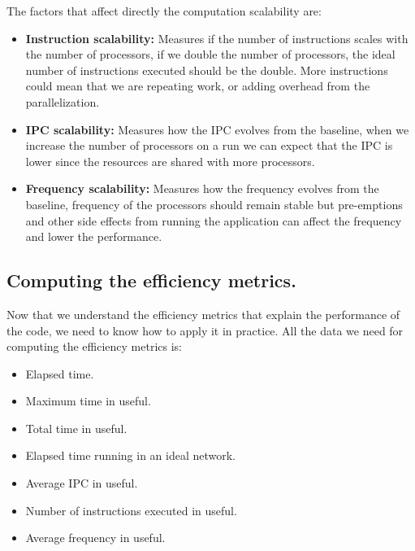 The factors that affect directly the computation scalability are:
\begin{itemize}
  \item \textbf{Instruction scalability:} Measures if the number of instructions scales with the number of processors, if we double the number of processors, the ideal number of instructions executed should be the double. More instructions could mean that we are repeating work, or adding overhead from the parallelization.

  \item \textbf{IPC scalability:} Measures how the IPC evolves from the baseline, when we increase the number of processors on a run we can expect that the IPC is lower since the resources are shared with more processors. 

  \item \textbf{Frequency scalability:} Measures how the frequency evolves from the baseline, frequency of the processors should remain stable but pre-emptions and other side effects from running the application can affect the frequency and lower the performance.
\end{itemize}

\subsection{Computing the efficiency metrics.}

Now that we understand the efficiency metrics that explain the performance of the code, we need to know how to apply it in practice. All the data we need for computing the efficiency metrics is:
\begin{itemize}
  \item Elapsed time.
  \item Maximum time in useful.
  \item Total time in useful.
  \item Elapsed time running in an ideal network.
  \item Average IPC in useful.
  \item Number of instructions executed in useful.
  \item Average frequency in useful.
\end{itemize}

